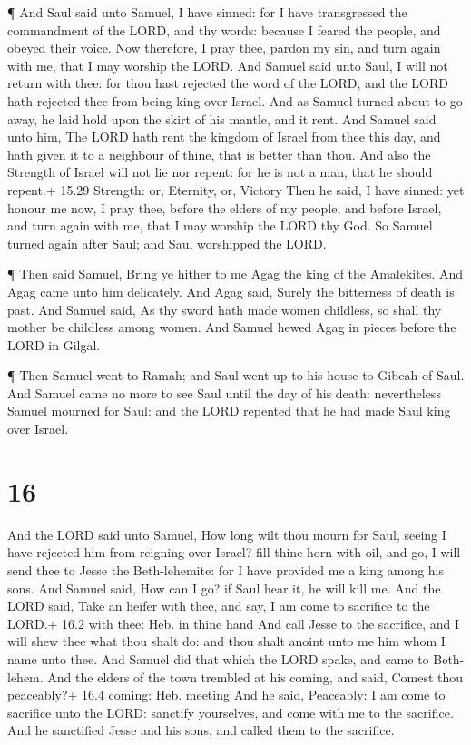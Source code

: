  ¶ And Saul said unto Samuel, I have sinned: for I have
transgressed the commandment of the LORD, and thy words: because I
feared the people, and obeyed their voice.  Now therefore,
I pray thee, pardon my sin, and turn again with me, that I may worship
the LORD.  And Samuel said unto Saul, I will not return
with thee: for thou hast rejected the word of the LORD, and the LORD
hath rejected thee from being king over Israel.  And as
Samuel turned about to go away, he laid hold upon the skirt of his
mantle, and it rent.  And Samuel said unto him, The LORD
hath rent the kingdom of Israel from thee this day, and hath given it to
a neighbour of thine, that is better than thou.  And also
the Strength of Israel will not lie nor repent: for he is not a man,
that he should repent.+ 15.29 Strength: or, Eternity, or, Victory
 Then he said, I have sinned: yet honour me now, I pray
thee, before the elders of my people, and before Israel, and turn again
with me, that I may worship the LORD thy God.  So Samuel
turned again after Saul; and Saul worshipped the LORD.

 ¶ Then said Samuel, Bring ye hither to me Agag the king of
the Amalekites. And Agag came unto him delicately. And Agag said, Surely
the bitterness of death is past.  And Samuel said, As thy
sword hath made women childless, so shall thy mother be childless among
women. And Samuel hewed Agag in pieces before the LORD in Gilgal.

 ¶ Then Samuel went to Ramah; and Saul went up to his house
to Gibeah of Saul.  And Samuel came no more to see Saul
until the day of his death: nevertheless Samuel mourned for Saul: and
the LORD repented that he had made Saul king over Israel.

\hypertarget{section-15}{%
\section{16}\label{section-15}}

 And the LORD said unto Samuel, How long wilt thou mourn for
Saul, seeing I have rejected him from reigning over Israel? fill thine
horn with oil, and go, I will send thee to Jesse the Beth-lehemite: for
I have provided me a king among his sons.  And Samuel said,
How can I go? if Saul hear it, he will kill me. And the LORD said, Take
an heifer with thee, and say, I am come to sacrifice to the LORD.+ 16.2
with thee: Heb. in thine hand  And call Jesse to the
sacrifice, and I will shew thee what thou shalt do: and thou shalt
anoint unto me him whom I name unto thee.  And Samuel did
that which the LORD spake, and came to Beth-lehem. And the elders of the
town trembled at his coming, and said, Comest thou peaceably?+ 16.4
coming: Heb. meeting  And he said, Peaceably: I am come to
sacrifice unto the LORD: sanctify yourselves, and come with me to the
sacrifice. And he sanctified Jesse and his sons, and called them to the
sacrifice.

